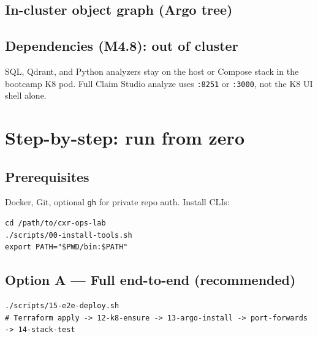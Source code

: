 \documentclass[11pt,a4paper]{report}
\begin{document}
\section{In-cluster object graph (Argo tree)}
\begin{center}
\end{center}

\section{Dependencies (M4.8): out of cluster}
SQL, Qdrant, and Python analyzers stay on the host or Compose stack in the bootcamp K8 pod. Full Claim Studio analyze uses \texttt{:8251} or \texttt{:3000}, not the K8 UI shell alone.

\chapter{Step-by-step: run from zero}

\section{Prerequisites}
Docker, Git, optional \texttt{gh} for private repo auth. Install CLIs:
\begin{lstlisting}[style=bash]
cd /path/to/cxr-ops-lab
./scripts/00-install-tools.sh
export PATH="$PWD/bin:$PATH"
\end{lstlisting}

\section{Option A --- Full end-to-end (recommended)}
\begin{lstlisting}[style=bash]
./scripts/15-e2e-deploy.sh
# Terraform apply -> 12-k8-ensure -> 13-argo-install -> port-forwards -> 14-stack-test
\end{lstlisting}
\end{document}
